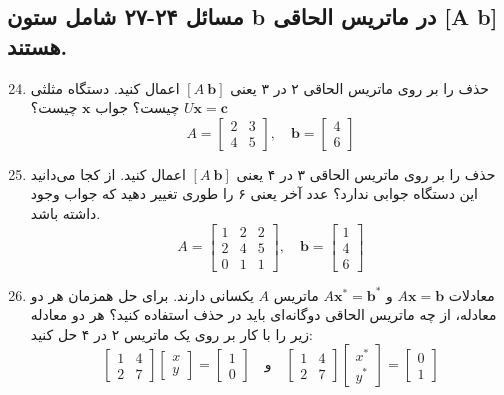 \documentclass[12pt, a4paper]{book}
\begin{document}
	\subsection*{مسائل ۲۴-۲۷ شامل ستون b در ماتریس الحاقی [A b] هستند.}
	\begin{enumerate}
		\setcounter{enumi}{23}
		\item حذف را بر روی ماتریس الحاقی ۲ در ۳ یعنی $[A \ \mathbf{b}]$ اعمال کنید. دستگاه مثلثی $U\mathbf{x}=\mathbf{c}$ چیست؟ جواب $\mathbf{x}$ چیست؟
		\[ A = \begin{bmatrix} 2 & 3 \\ 4 & 5 \end{bmatrix}, \quad \mathbf{b} = \begin{bmatrix} 4 \\ 6 \end{bmatrix} \]
		\item حذف را بر روی ماتریس الحاقی ۳ در ۴ یعنی $[A \ \mathbf{b}]$ اعمال کنید. از کجا می‌دانید این دستگاه جوابی ندارد؟ عدد آخر یعنی ۶ را طوری تغییر دهید که جواب وجود داشته باشد.
		\[ A = \begin{bmatrix} 1 & 2 & 2 \\ 2 & 4 & 5 \\ 0 & 1 & 1 \end{bmatrix}, \quad \mathbf{b} = \begin{bmatrix} 1 \\ 4 \\ 6 \end{bmatrix} \]
		\item معادلات $A\mathbf{x}=\mathbf{b}$ و $A\mathbf{x}^*=\mathbf{b}^*$ ماتریس $A$ یکسانی دارند. برای حل همزمان هر دو معادله، از چه ماتریس الحاقی دوگانه‌ای باید در حذف استفاده کنید؟
		هر دو معادله زیر را با کار بر روی یک ماتریس ۲ در ۴ حل کنید:
		\[ \begin{bmatrix} 1 & 4 \\ 2 & 7 \end{bmatrix} \begin{bmatrix} x \\ y \end{bmatrix} = \begin{bmatrix} 1 \\ 0 \end{bmatrix} \quad \text{و} \quad \begin{bmatrix} 1 & 4 \\ 2 & 7 \end{bmatrix} \begin{bmatrix} x^* \\ y^* \end{bmatrix} = \begin{bmatrix} 0 \\ 1 \end{bmatrix} \]

\end{enumerate}
\end{document}
